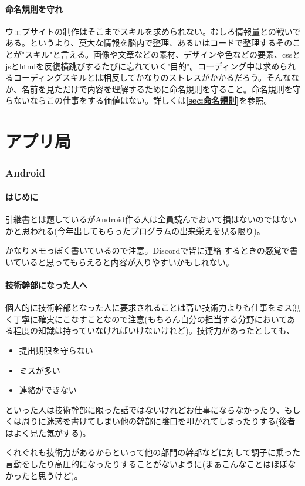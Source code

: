 \documentclass[dvipdfmx,jb5]{jarticle}
\begin{document}
\subsection{命名規則を守れ}
ウェブサイトの制作はそこまでスキルを求められない。むしろ情報量との戦いである。というより、莫大な情報を脳内で整理、あるいはコードで整理するそのことが"スキル"と言える。画像や文章などの素材、デザインや色などの要素、cssとjsとhtmlを反復横跳びするたびに忘れていく"目的"。コーディング中は求められるコーディングスキルとは相反してかなりのストレスがかかるだろう。そんななか、名前を見ただけで内容を理解するために命名規則を守ること。命名規則を守らないならこの仕事をする価値はない。詳しくは{\bf\ref{sec:命名規則}}を参照。

 \newpage
 \part{アプリ局}
 \section{Android}
 \subsection{はじめに}
 引継書とは題しているがAndroid作る人は全員読んでおいて損はないのではないかと思われる(今年出してもらったプログラムの出来栄えを見る限り)。\par
かなりメモっぽく書いているので注意。Discordで皆に連絡
するときの感覚で書いていると思ってもらえると内容が入りやすいかもしれない。
 \subsection{技術幹部になった人へ}
 個人的に技術幹部となった人に要求されることは高い技術力よりも仕事をミス無く丁寧に確実にこなすことなので注意(もちろん自分の担当する分野においてある程度の知識は持っていなければいけないけれど)。技術力があったとしても、
 \begin{itemize}
 \item 提出期限を守らない
 \item ミスが多い
 \item 連絡ができない
 \end{itemize}
 といった人は技術幹部に限った話ではないけれどお仕事にならなかったり、もしくは周りに迷惑を書けてしまい他の幹部に陰口を叩かれてしまったりする(後者はよく見た気がする)。\par
くれぐれも技術力があるからといって他の部門の幹部などに対して調子に乗った言動をしたり高圧的になったりすることがないように(まぁこんなことはほぼなかったと思うけど)。
\end{document}
